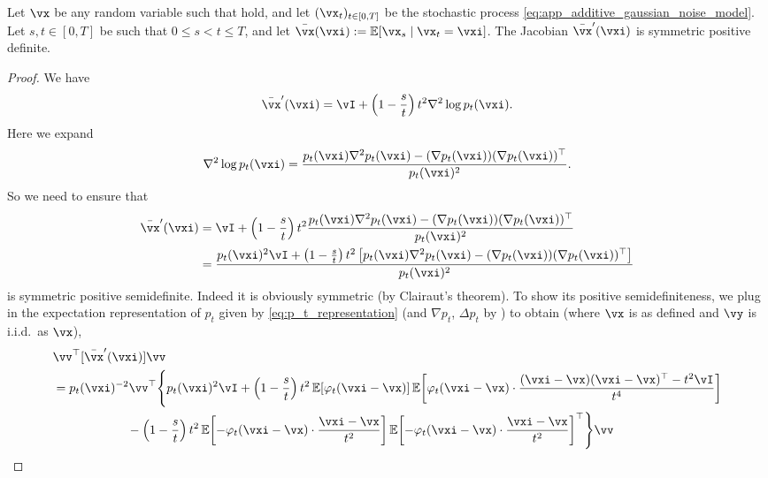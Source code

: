 \documentclass[../../book-main.tex]{subfiles}
\begin{document}
\begin{lemma}\label{lem:gribonval_A1}
    Let \(\vx\) be any random variable such that  hold, and let \((\vx_{t})_{t \in [0, T]}\) be the stochastic process \eqref{eq:app_additive_gaussian_noise_model}. Let \(s, t \in [0, T]\) be such that \(0 \leq s < t \leq T\), and let \(\bar{\vx}(\vxi) := \Ex[\vx_{s} \mid \vx_{t} = \vxi]\). The Jacobian \(\bar{\vx}^{\prime}(\vxi)\) is symmetric positive definite.
\end{lemma}
\begin{proof}
    We have 
    \begin{equation}
        \bar{\vx}^{\prime}(\vxi) = \vI + \bp{1 - \frac{s}{t}}t^{2}\nabla^{2}\log p_{t}(\vxi).
    \end{equation}
    Here we expand 
    \begin{equation}
        \nabla^{2}\log p_{t}(\vxi) = \frac{p_{t}(\vxi)\nabla^{2}p_{t}(\vxi) - (\nabla p_{t}(\vxi))(\nabla p_{t}(\vxi))^{\top}}{p_{t}(\vxi)^{2}}.
    \end{equation}
    So we need to ensure that 
    \begin{align}
        \bar{\vx}^{\prime}(\vxi)
        &= \vI + \bp{1 - \frac{s}{t}}t^{2}\frac{p_{t}(\vxi)\nabla^{2}p_{t}(\vxi) - (\nabla p_{t}(\vxi))(\nabla p_{t}(\vxi))^{\top}}{p_{t}(\vxi)^{2}} \\
        &= \frac{p_{t}(\vxi)^{2}\vI + \bp{1 - \frac{s}{t}}t^{2}\bs{p_{t}(\vxi)\nabla^{2}p_{t}(\vxi) - (\nabla p_{t}(\vxi))(\nabla p_{t}(\vxi))^{\top}}}{p_{t}(\vxi)^{2}}
    \end{align}
    is symmetric positive semidefinite. Indeed it is obviously symmetric (by Clairaut's theorem). To show its positive semidefiniteness, we plug in the expectation representation of \(p_{t}\) given by \eqref{eq:p_t_representation} (and \(\nabla p_{t}\), \(\Delta p_{t}\) by ) to obtain (where \(\vx\) is as defined and \(\vy\) is i.i.d.~as \(\vx\)),
    \begin{align}
        &\vv^{\top}[\bar{\vx}^{\prime}(\vxi)]\vv \\
        &= p_{t}(\vxi)^{-2}\vv^{\top}\Bigg\{p_{t}(\vxi)^{2}\vI + \bp{1 - \frac{s}{t}}t^{2}\Ex[\phi_{t}(\vxi - \vx)]\Ex\rs{\phi_{t}(\vxi - \vx)\cdot\frac{(\vxi - \vx)(\vxi - \vx)^{\top} - t^{2}\vI}{t^{4}}} \\
        & \qquad \qquad \qquad -\bp{1 - \frac{s}{t}}t^{2}\Ex\rs{-\phi_{t}(\vxi - \vx)\cdot\frac{\vxi - \vx}{t^{2}}}\Ex\rs{-\phi_{t}(\vxi - \vx)\cdot\frac{\vxi - \vx}{t^{2}}}^{\top}\Bigg\}\vv \\

\end{align}
\end{proof}
\end{document}
